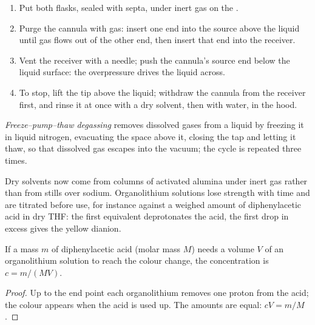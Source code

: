 \begin{method}\label{met:b3:lab-techniques-3:cannula}
\begin{enumerate}
  \item Put both flasks, sealed with septa, under inert gas on the .
  \item Purge the cannula with gas: insert one end into the source above the liquid
        until gas flows out of the other end, then insert that end into the receiver.
  \item Vent the receiver with a needle; push the cannula's source end below the
        liquid surface: the overpressure drives the liquid across.
  \item To stop, lift the tip above the liquid; withdraw the cannula from the receiver
        first, and rinse it at once with a dry solvent, then with water, in the hood.
\end{enumerate}
\end{method}

\begin{definition}\label{def:b3:lab-techniques-3:degassing}
\emph{Freeze--pump--thaw degassing} removes
dissolved gases from a liquid by freezing it in liquid nitrogen, evacuating the
space above it, closing the tap and letting it thaw, so that dissolved gas escapes
into the vacuum; the cycle is repeated three times.
\end{definition}

Dry solvents now come from columns of activated alumina under inert gas
rather than from stills over sodium. Organolithium solutions lose strength with
time and are titrated before use, for instance against a weighed amount of
diphenylacetic acid in dry THF: the first equivalent deprotonates the acid, the
first drop in excess gives the yellow dianion.

\begin{proposition}\label{prop:b3:lab-techniques-3:titre}
If a mass $m$ of diphenylacetic acid (molar mass $M$) needs a volume $V$ of an
organolithium solution to reach the colour change, the concentration is $c = m/(MV)$.
\end{proposition}

\begin{proof}
Up to the end point each organolithium removes one proton from the acid; the
colour appears when the acid is used up. The amounts are equal: $cV = m/M$.
\end{proof}


